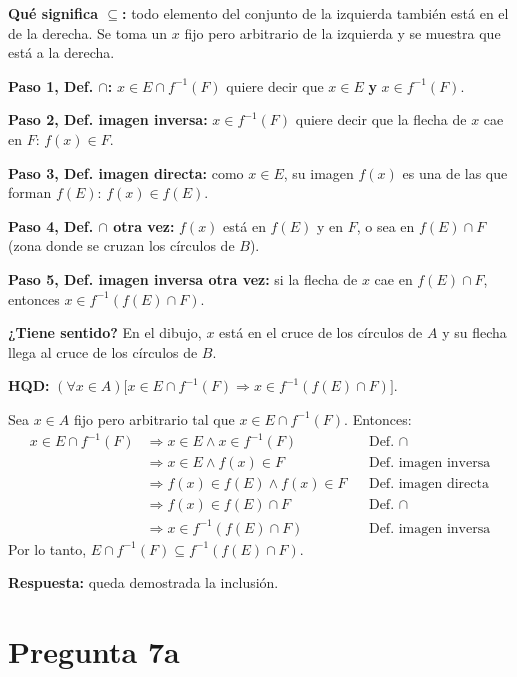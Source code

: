 \documentclass[11pt]{article}
\newcommand{\jus}[1]{&&\text{#1}}
\begin{document}
\begin{explica}
\textbf{Qué significa $\subseteq$:} todo elemento del conjunto de la izquierda también está en el de la derecha. Se toma un $x$ fijo pero arbitrario de la izquierda y se muestra que está a la derecha.

\textbf{Paso 1, Def. $\cap$:} $x\in E\cap f^{-1}(F)$ quiere decir que $x\in E$ \textbf{y} $x\in f^{-1}(F)$.

\textbf{Paso 2, Def. imagen inversa:} $x\in f^{-1}(F)$ quiere decir que la flecha de $x$ cae en $F$: $f(x)\in F$.

\textbf{Paso 3, Def. imagen directa:} como $x\in E$, su imagen $f(x)$ es una de las que forman $f(E)$: $f(x)\in f(E)$.

\textbf{Paso 4, Def. $\cap$ otra vez:} $f(x)$ está en $f(E)$ y en $F$, o sea en $f(E)\cap F$ (zona donde se cruzan los círculos de $B$).

\textbf{Paso 5, Def. imagen inversa otra vez:} si la flecha de $x$ cae en $f(E)\cap F$, entonces $x\in f^{-1}(f(E)\cap F)$.

\textbf{¿Tiene sentido?} En el dibujo, $x$ está en el cruce de los círculos de $A$ y su flecha llega al cruce de los círculos de $B$.
\end{explica}

\textbf{HQD:} $(\forall x\in A)\big[x\in E\cap f^{-1}(F)\Rightarrow x\in f^{-1}(f(E)\cap F)\big]$.

Sea $x\in A$ fijo pero arbitrario tal que $x\in E\cap f^{-1}(F)$. Entonces:
\begin{align*}
x\in E\cap f^{-1}(F)&\Rightarrow x\in E\wedge x\in f^{-1}(F)\jus{Def. $\cap$}\\
&\Rightarrow x\in E\wedge f(x)\in F\jus{Def. imagen inversa}\\
&\Rightarrow f(x)\in f(E)\wedge f(x)\in F\jus{Def. imagen directa}\\
&\Rightarrow f(x)\in f(E)\cap F\jus{Def. $\cap$}\\
&\Rightarrow x\in f^{-1}(f(E)\cap F)\jus{Def. imagen inversa}
\end{align*}
Por lo tanto, $E\cap f^{-1}(F)\subseteq f^{-1}(f(E)\cap F)$.

\textbf{Respuesta:} queda demostrada la inclusión.

\clearpage
\section*{Pregunta 7a}
\end{document}
